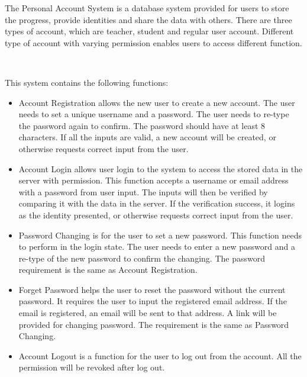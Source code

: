 The Personal Account System is a database system provided for users to store the progress, provide identities and share the data with others. There are three types of account, which are teacher, student and regular user account. Different type of account with varying permission enables users to access different function.

~

This system contains the following functions:
\begin{itemize}
	\item Account Registration allows the new user to create a new account. The user needs to set a unique username and a password. The user needs to re-type the password again to confirm. The password should have at least 8 characters. If all the inputs are valid, a new account will be created, or otherwise requests correct input from the user.
	\item Account Login allows user login to the system to access the stored data in the server with permission. This function accepts a username or email address with a password from user input. The inputs will then be verified by comparing it with the data in the server. If the verification success, it logins as the identity presented, or otherwise requests correct input from the user.
	\item Password Changing is for the user to set a new password. This function needs to perform in the login state. The user needs to enter a new password and a re-type of the new password to confirm the changing. The password requirement is the same as Account Registration.
	\item Forget Password helps the user to reset the password without the current password. It requires the user to input the registered email address. If the email is registered, an email will be sent to that address. A link will be provided for changing password. The requirement is the same as Password Changing.
	\item Account Logout is a function for the user to log out from the account. All the permission will be revoked after log out.
\end{itemize}